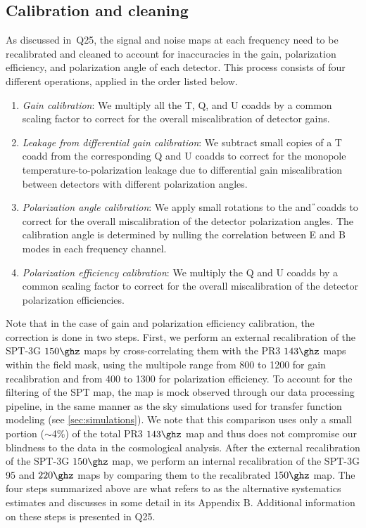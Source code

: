 \subsection{Calibration and cleaning}
\label{sec:calibration}
As discussed in~Q25, the signal and noise maps at each frequency need to be recalibrated and cleaned to account for inaccuracies in the gain, polarization efficiency, and polarization angle of each detector. 
This process consists of four different operations, applied in the order listed below.
\begin{enumerate}
	\item \emph{Gain calibration}: We multiply all the T, Q, and U coadds by a common scaling factor to correct for the overall miscalibration of detector gains.
	\item \emph{Leakage from differential gain calibration}: We subtract small copies of a T coadd from the corresponding Q and U coadds to correct for the monopole temperature-to-polarization leakage due to differential gain miscalibration between detectors with different polarization angles.
	\item \emph{Polarization angle calibration}: 
	We apply small rotations to the \Q{} and \U{} coadds to correct for the overall miscalibration of the detector polarization angles.
	The calibration angle is determined by nulling the correlation between E and B modes in each frequency channel.
	\item \emph{Polarization efficiency calibration}: We multiply the Q and U coadds by a common scaling factor to correct for the overall miscalibration of the detector polarization efficiencies.
\end{enumerate}

Note that in the case of gain and polarization efficiency calibration, the correction is done in two steps.
First, we perform an external recalibration of the SPT-3G $150\ghz$ maps by cross-correlating them with the \planck{} PR3 $143\ghz$ maps within the \mainfield{} field mask, using the multipole range from 800 to 1200 for gain recalibration and from 400 to 1300 for polarization efficiency.
To account for the filtering of the SPT map, the \planck{} map is mock observed through our data processing pipeline, in the same manner as the sky simulations used for transfer function modeling (see \cref{sec:simulations}). 
We note that this comparison uses only a small portion ($\sim$4\%) of the total \planck{} PR3 $143\ghz$ map and thus does not compromise our blindness to the \planck{} data in the cosmological analysis.
After the external recalibration of the SPT-3G $150\ghz$ map, we perform an internal recalibration of the SPT-3G 95 and $220\ghz$ maps by comparing them to the recalibrated $150\ghz$ map. 
The four steps summarized above are what \citep{ge24} refers to as the alternative systematics estimates and discusses in some detail in its Appendix B. 
Additional information on these steps is presented in Q25.

